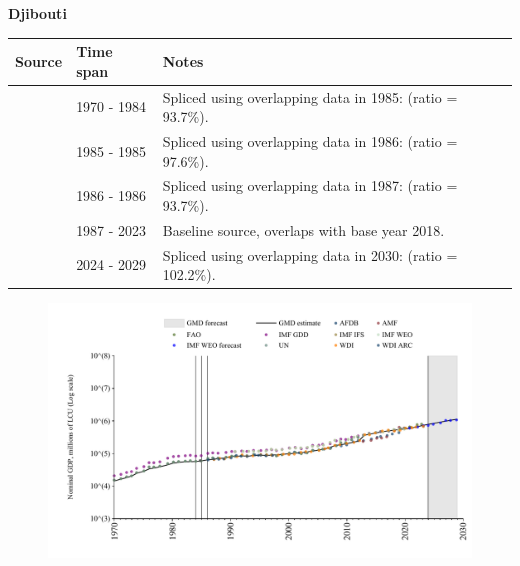 \documentclass[12pt,a4paper,landscape]{article}
\begin{document}
\begin{adjustbox}{max totalsize={\paperwidth}{\paperheight},center}
\begin{minipage}[t][\textheight][t]{\textwidth}
\vspace*{0.5cm}
{}
\begin{center}
{\Large\bfseries Djibouti}
\end{center}
\vspace{0.5cm}
\begin{table}[H]
\centering
\small
\begin{tabular}{|l|l|l|}
\hline
\textbf{Source} & \textbf{Time span} & \textbf{Notes} \\
\hline
\rowcolor{white}\cite{UN}& 1970 - 1984 &Spliced using overlapping data in 1985: (ratio = 93.7\%).\\
\rowcolor{lightgray}\cite{WDI}& 1985 - 1985 &Spliced using overlapping data in 1986: (ratio = 97.6\%).\\
\rowcolor{white}\cite{UN}& 1986 - 1986 &Spliced using overlapping data in 1987: (ratio = 93.7\%).\\
\rowcolor{lightgray}\cite{WDI}& 1987 - 2023 &Baseline source, overlaps with base year 2018.\\
\rowcolor{white}\cite{IMF_WEO_forecast}& 2024 - 2029 &Spliced using overlapping data in 2030: (ratio = 102.2\%).\\
\hline
\end{tabular}
\end{table}
\begin{figure}[H]
\centering
\includegraphics[width=\textwidth,height=0.6\textheight,keepaspectratio]{graphs/DJI_nGDP.pdf}
\end{figure}
\end{minipage}
\end{adjustbox}
\end{document}
